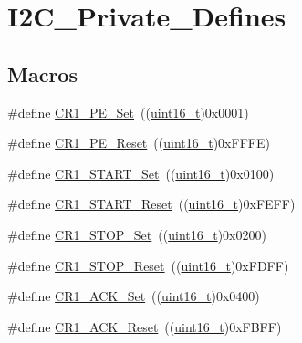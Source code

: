 \hypertarget{group___i2_c___private___defines}{}\section{I2\+C\+\_\+\+Private\+\_\+\+Defines}
\label{group___i2_c___private___defines}
\subsection*{Macros}
\begin{DoxyCompactItemize}
\item 
\#define \hyperlink{group___i2_c___private___defines_ga913b708338087f3ffc2fba2b05a38917}{C\+R1\+\_\+\+P\+E\+\_\+\+Set}~((\hyperlink{_p_e___types_8h_a1f1825b69244eb3ad2c7165ddc99c956}{uint16\+\_\+t})0x0001)
\item 
\#define \hyperlink{group___i2_c___private___defines_ga21dc289f16c502a2bc0a88e1514a8ee0}{C\+R1\+\_\+\+P\+E\+\_\+\+Reset}~((\hyperlink{_p_e___types_8h_a1f1825b69244eb3ad2c7165ddc99c956}{uint16\+\_\+t})0x\+F\+F\+F\+E)
\item 
\#define \hyperlink{group___i2_c___private___defines_ga53820dd338da9779d039718148184ef9}{C\+R1\+\_\+\+S\+T\+A\+R\+T\+\_\+\+Set}~((\hyperlink{_p_e___types_8h_a1f1825b69244eb3ad2c7165ddc99c956}{uint16\+\_\+t})0x0100)
\item 
\#define \hyperlink{group___i2_c___private___defines_gacc62242e31a380aec2ef9f836b3cf19d}{C\+R1\+\_\+\+S\+T\+A\+R\+T\+\_\+\+Reset}~((\hyperlink{_p_e___types_8h_a1f1825b69244eb3ad2c7165ddc99c956}{uint16\+\_\+t})0x\+F\+E\+F\+F)
\item 
\#define \hyperlink{group___i2_c___private___defines_gac14ffc5548d2c30d21c49612c57e52be}{C\+R1\+\_\+\+S\+T\+O\+P\+\_\+\+Set}~((\hyperlink{_p_e___types_8h_a1f1825b69244eb3ad2c7165ddc99c956}{uint16\+\_\+t})0x0200)
\item 
\#define \hyperlink{group___i2_c___private___defines_gac44124bc7b468c7dee8188712e407e02}{C\+R1\+\_\+\+S\+T\+O\+P\+\_\+\+Reset}~((\hyperlink{_p_e___types_8h_a1f1825b69244eb3ad2c7165ddc99c956}{uint16\+\_\+t})0x\+F\+D\+F\+F)
\item 
\#define \hyperlink{group___i2_c___private___defines_ga1f74487a0fbffdcd8a4c440c732dc316}{C\+R1\+\_\+\+A\+C\+K\+\_\+\+Set}~((\hyperlink{_p_e___types_8h_a1f1825b69244eb3ad2c7165ddc99c956}{uint16\+\_\+t})0x0400)
\item 
\#define \hyperlink{group___i2_c___private___defines_gaa8bcbe2f6089d896aff8e7770368aada}{C\+R1\+\_\+\+A\+C\+K\+\_\+\+Reset}~((\hyperlink{_p_e___types_8h_a1f1825b69244eb3ad2c7165ddc99c956}{uint16\+\_\+t})0x\+F\+B\+F\+F)

\end{DoxyCompactItemize}
